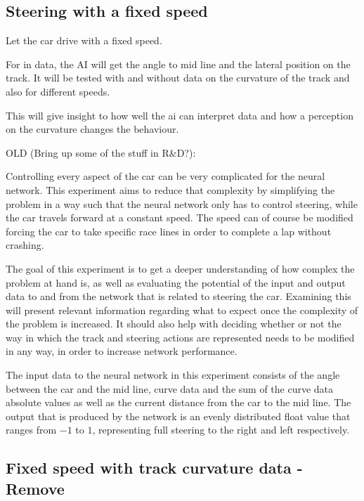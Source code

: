 \subsection{Steering with a fixed speed}
Let the car drive with a fixed speed. 

For in data, the AI will get the angle to mid line and the lateral position on the track. It will be tested with and without data on the curvature of the track and also for different speeds. 

This will give insight to how well the ai can interpret data and how a perception on the curvature changes the behaviour.


OLD (Bring up some of the stuff in R\&D?):

Controlling every aspect of the car can be very complicated for the neural network. This experiment aims to reduce that complexity by simplifying the problem in a way such that the neural network only has to control steering, while the car travels forward at a constant speed. The speed can of course be modified forcing the car to take specific race lines in order to complete a lap without crashing.

The goal of this experiment is to get a deeper understanding of how complex the problem at hand is, as well as evaluating the potential of the input and output data to and from the network that is related to steering the car. Examining this will present relevant information regarding what to expect once the complexity of the problem is increased. It should also help with deciding whether or not the way in which the track and steering actions are represented needs to be modified in any way, in order to increase network performance.

The input data to the neural network in this experiment consists of the angle between the car and the mid line, curve data and the sum of the curve data absolute values as well as the current distance from the car to the mid line. The output that is produced by the network is an evenly distributed float value that ranges from $-1$ to $1$, representing full steering to the right and left respectively.

\subsection{Fixed speed with track curvature data - Remove}

